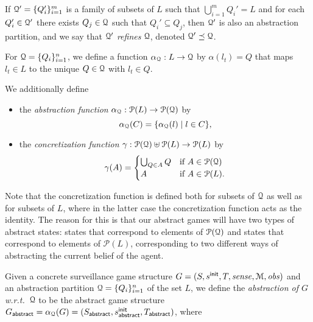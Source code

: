 If $\mathcal{Q}' =  \{Q_i'\}_{i=1}^m$ is a family of subsets of $L$ such that $\bigcup_{i=1}^m Q_i' = L$ and for each $Q_i' \in \mathcal{Q}'$ there exists $Q_j \in \mathcal{Q}$ such that $Q_i' \subseteq Q_j$, then $\mathcal{Q}'$ is also an abstraction partition, and we say that $\mathcal{Q}'$ \emph{refines} $\mathcal{Q}$, denoted $\mathcal{Q}' \preceq \mathcal{Q}$.

\bigskip

For $\mathcal{Q} = \{Q_i\}_{i=1}^n$,  we define a function $\alpha_{\mathcal{Q}} : L \to \mathcal{Q}$ by $\alpha(l_t) = Q$ that maps $l_t \in L$ to the unique $Q \in \mathcal{Q}$ with $l_t \in Q$. 

\smallskip 

We additionally define
\begin{itemize}
    \item the \emph{abstraction function}  $\alpha_{\mathcal{Q}} : \mathcal{P}(L) \to \mathcal{P}(\mathcal{Q})$ by 
    \[\alpha_{\mathcal{Q}}(C) = \{\alpha_{\mathcal{Q}}(l)  \mid l \in C\},\]
    \item the \emph{concretization function} 
    $\gamma :  \mathcal{P}(\mathcal{Q}) \uplus \mathcal{P}(L) \to \mathcal{P}(L)$ by
\[\gamma(A) = \begin{cases}
\bigcup_{Q \in A} Q & \text{if } A \in \mathcal{P}(\mathcal{Q})\\
A & \text{if } A \in \mathcal{P}(L). 
\end{cases}
\]
\end{itemize}
Note that the concretization function is defined both for subsets of $\mathcal{Q}$ as well as for subsets of $L$, where in the latter case the concretization function acts as the identity. The reason for this is that our abstract games will have two types of abstract states: states that correspond to elements of $\mathcal{P}(\mathcal{Q})$ and states that correspond to elements of $\mathcal{P}(L)$, corresponding to two different ways of abstracting the current belief of the agent.

\bigskip

Given a concrete surveillance game structure $G  = (S,s^{\mathsf{init}},T,\mathit{sense},\mathcal M,\mathit{obs})$ and an abstraction partition $\mathcal{Q} = \{Q_i\}_{i=1}^n$ of the set $L$, we define the \emph{abstraction of $G$ w.r.t.\ $\mathcal{Q}$} to be the abstract game structure
$G_{\mathsf{abstract}}  = \alpha_{\mathcal{Q}}(G)= (S_{\mathsf{abstract}},s^{\mathsf{init}}_{\mathsf{abstract}},T_{\mathsf{abstract}})$, where

